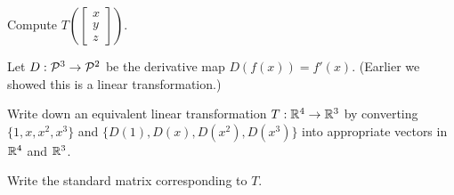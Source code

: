 \begin{applicationActivities}{1}{17}
\begin{activity}{5}
Compute $T\left(\begin{bmatrix} x\\ y \\ z \end{bmatrix} \right) $.
\end{activity}


\begin{activity}{10}
Let $D: \P^3 \rightarrow \P^2$ be the derivative map \(D(f(x))=f'(x)\).
(Earlier we showed this is a linear transformation.)
\begin{subactivity}
Write down an equivalent linear transformation $T: \IR^4 \rightarrow \IR^3$
by converting \(\{1,x,x^2,x^3\}\) and \(\{D(1),D(x),D(x^2),D(x^3)\}\) into
appropriate vectors in \(\IR^4\) and \(\IR^3\).
\end{subactivity}
\begin{subactivity}
Write the standard matrix corresponding to $T$.
\end{subactivity}
\end{activity}

\end{applicationActivities}
